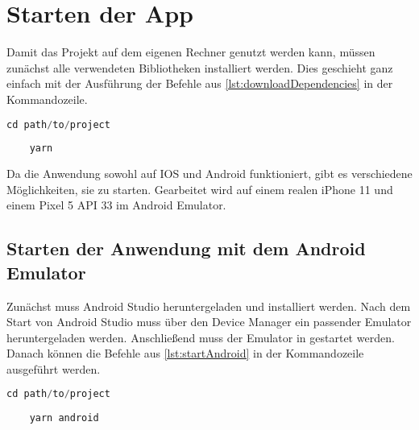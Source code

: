 \chapter{Starten der App}
Damit das Projekt auf dem eigenen Rechner genutzt werden kann, müssen zunächst alle verwendeten Bibliotheken installiert werden. Dies geschieht ganz einfach mit der Ausführung der Befehle aus \autoref{lst:downloadDependencies} in der Kommandozeile.

\begin{lstlisting}[caption={Diese Befehle müssen in die Kommandozeile eingegeben und anschließend ausgeführt werden, damit das Projekt verwendet werden kann. So werden die notwendigen Bibliotheken installiert.},captionpos=b, language=Java, label=lst:downloadDependencies]
	cd path/to/project
	
	yarn
\end{lstlisting}


Da die Anwendung sowohl auf IOS und Android funktioniert, gibt es verschiedene Möglichkeiten, sie zu starten. Gearbeitet wird auf einem realen iPhone 11 und einem Pixel 5 API 33 im Android Emulator. 

\section{Starten der Anwendung mit dem Android Emulator} 
Zunächst muss Android Studio heruntergeladen und installiert werden. Nach dem Start von Android Studio muss über den Device Manager ein passender Emulator heruntergeladen werden. Anschließend muss der Emulator in gestartet werden. Danach können die Befehle aus \autoref{lst:startAndroid} in der Kommandozeile ausgeführt werden.
\begin{lstlisting}[caption={Um die Anwendung mit mit Android zu starten, sollte Android Studio heruntergeladen und installiert werden. Anschließend muss der passende Emulator über den Device Manager hinzugefügt und gestartet werden. Danach werden diese Befehle in die Kommandozeile eingegeben und ausgeführt.},captionpos=b, language=Java, label=lst:startAndroid]
	cd path/to/project
	
	yarn android
\end{lstlisting}
	
